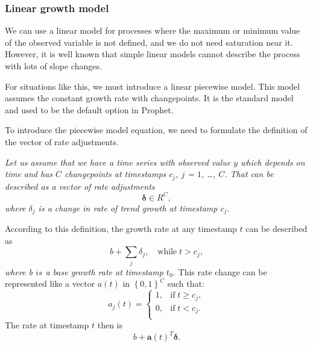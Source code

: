 \subsubsection{Linear growth model}

We can use a linear model for processes where the maximum or minimum value of the observed variable is not defined, and we do not need saturation near it. However, it is well known that simple linear models cannot describe the process with lots of slope changes. 

For situations like this,  we must introduce a linear piecewise model. This model assumes the constant growth rate with changepoints. It is the standard model and used to be the default option in Prophet. 

To introduce the piecewise model equation, we need to formulate the definition of the vector of rate adjustments.
\begin{definition}
\textit{Let us assume that we have a time series with observed value $y$ which depends on time and has $C$ changepoints at timestamps $c_j$, $j$ = $1$, \ldots, $C$. That can be described as a vector of rate adjustments
\begin{equation}
    \boldsymbol{\delta} \in R^C,
\label{eq_adj_vector}
\end{equation}
where $\delta_{j}$ is a change in rate of trend growth at timestamp $c_j$.}
\end{definition}

According to this definition, the growth rate at any timestamp $t$ can be described as
\begin{equation}
    b + \sum_{j} \delta_{j}, \quad \text{while} \; t > c_j,
\end{equation}
\textit{where b $is$ a base growth rate at timestamp $t_{0}$.}
This rate change can be represented like a vector $a(t)$ in $\left\{0, 1\right\}^{C}$ such that: 
\begin{equation}
    a_{j}(t)=   \left\{
\begin{array}{ll}
      1, & \text{if} \; t \geq c_j, \\
      0, & \text{if} \;t < c_j. \\
\end{array} 
\right.  
\label{eq_used_changepoint_vector}
\end{equation}
The rate at timestamp $t$ then is 
\begin{equation}
b + \mathbf{a}(t)^{T}\boldsymbol{\delta}.
\label{eq_growth_rate_t}
\end{equation}

